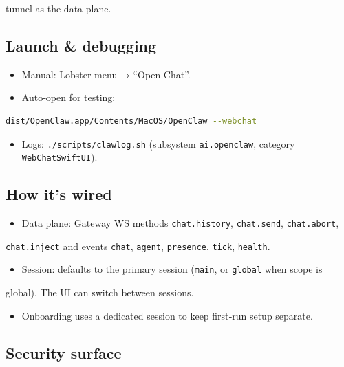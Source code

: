 tunnel as the data plane.

\subsection{Launch \& debugging}


\begin{itemize}
  \item Manual: Lobster menu → “Open Chat”.
  \item Auto‑open for testing:
\end{itemize}


\begin{lstlisting}[language=bash]
  dist/OpenClaw.app/Contents/MacOS/OpenClaw --webchat
\end{lstlisting}


\begin{itemize}
  \item Logs: \texttt{./scripts/clawlog.sh} (subsystem \texttt{ai.openclaw}, category \texttt{WebChatSwiftUI}).
\end{itemize}


\subsection{How it’s wired}


\begin{itemize}
  \item Data plane: Gateway WS methods \texttt{chat.history}, \texttt{chat.send}, \texttt{chat.abort},
\end{itemize}

\texttt{chat.inject} and events \texttt{chat}, \texttt{agent}, \texttt{presence}, \texttt{tick}, \texttt{health}.
\begin{itemize}
  \item Session: defaults to the primary session (\texttt{main}, or \texttt{global} when scope is
\end{itemize}

global). The UI can switch between sessions.
\begin{itemize}
  \item Onboarding uses a dedicated session to keep first‑run setup separate.
\end{itemize}


\subsection{Security surface}


